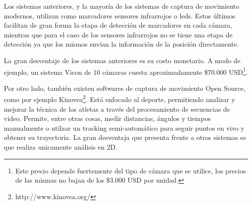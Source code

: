 Los sistemas anteriores, y la mayoría de los sistemas de captura de movimiento modernos, utilizan como marcadores sensores infrarrojos o leds. Estos últimos facilitan de gran forma la etapa de detección de marcadores en cada cámara, mientras que para el caso de los sensores infrarrojos no se tiene una etapa de detección ya que los mismos envían la información de la posición directamente.

La gran desventaje de los sistemas anteriores es su costo monetario. A modo de ejemplo, un sistema Vicon de 10 cámaras cuesta aproximadamente \$70.000 USD\footnote{Este precio depende fuertemente del tipo de cámara que se utilice, los precios de las mismas no bajan de los \$3.000 USD por unidad.}.

Por otro lado, también existen softwares de captura de movimiento Open Source, como por ejemplo Kinovea\footnote{http://www.kinovea.org/}. Está enfocado al deporte, permitiendo analizar y mejorar la técnica de los atletas a través del procesamiento de secuencias de video. Permite, entre otras cosas, medir distancias, ángulos y tiempos manualmente o utilzar un tracking semi-automático para seguir puntos en vivo y obtener su trayectoria. La gran desventaja que presenta frente a otros sistemas es que realiza unicamente análisis en 2D.

